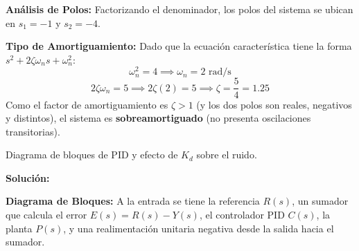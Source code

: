 \documentclass[11pt, a4paper]{article}
\begin{document}
\textbf{Análisis de Polos:} Factorizando el denominador, los polos del sistema se ubican en $s_1 = -1$ y $s_2 = -4$.

\textbf{Tipo de Amortiguamiento:} Dado que la ecuación característica tiene la forma $s^2 + 2\zeta\omega_n s + \omega_n^2$:
$$\omega_n^2 = 4 \implies \omega_n = 2\text{ rad/s}$$
$$2\zeta\omega_n = 5 \implies 2\zeta(2) = 5 \implies \zeta = \frac{5}{4} = 1.25$$
Como el factor de amortiguamiento es $\zeta > 1$ (y los dos polos son reales, negativos y distintos), el sistema es \textbf{sobreamortiguado} (no presenta oscilaciones transitorias).

\begin{center}
\end{center}

\begin{enunciado}
Diagrama de bloques de PID y efecto de $K_d$ sobre el ruido.
\end{enunciado}

\textbf{Solución:}

\textbf{Diagrama de Bloques:}
A la entrada se tiene la referencia $R(s)$, un sumador que calcula el error $E(s) = R(s) - Y(s)$, el controlador PID $C(s)$, la planta $P(s)$, y una realimentación unitaria negativa desde la salida hacia el sumador.
\end{document}
